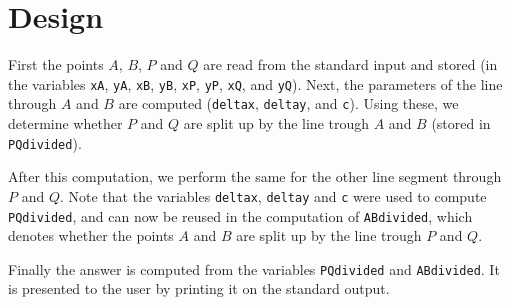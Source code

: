 \documentclass[a4paper,10pt]{article}
\begin{document}
\section{Design}
First the points $A$, $B$, $P$ and $Q$ are read from the standard input and stored (in the variables {\tt xA}, {\tt yA}, {\tt xB}, {\tt yB}, {\tt xP}, {\tt yP}, {\tt xQ}, and {\tt yQ}). 
Next, the parameters of the line through $A$ and $B$ are computed ({\tt deltax}, {\tt deltay}, and {\tt c}). Using these, we determine whether $P$ and $Q$ are split up by the line trough $A$ and $B$ (stored in {\tt PQdivided}).


After this computation, we perform the same for the other line segment through $P$ and $Q$.
Note that the variables {\tt deltax}, {\tt deltay} and {\tt c} were used to compute {\tt PQdivided}, and can now be reused in the computation of {\tt ABdivided}, which denotes 
whether the points $A$ and $B$ are split up by the line trough $P$ and $Q$.

Finally the answer is computed from the variables  {\tt PQdivided} and {\tt ABdivided}.
It is presented to the user by printing it on the standard output.
\end{document}

